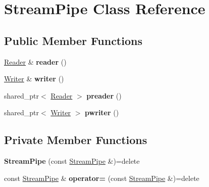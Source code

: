 \hypertarget{classStreamPipe}{\section{Stream\+Pipe Class Reference}
\label{classStreamPipe}
}
\subsection*{Public Member Functions}
\begin{DoxyCompactItemize}
\item 
\hypertarget{classStreamPipe_a3bda0cad2eeb4d45ba08e38bf4ff1e80}{\hyperlink{classReader}{Reader} \& {\bfseries reader} ()}\label{classStreamPipe_a3bda0cad2eeb4d45ba08e38bf4ff1e80}

\item 
\hypertarget{classStreamPipe_a88c87ff7040e79a8990da18a9cc24fbf}{\hyperlink{classWriter}{Writer} \& {\bfseries writer} ()}\label{classStreamPipe_a88c87ff7040e79a8990da18a9cc24fbf}

\item 
\hypertarget{classStreamPipe_a39bd201e4fc7dd256f1f8cab308102cc}{shared\+\_\+ptr$<$ \hyperlink{classReader}{Reader} $>$ {\bfseries preader} ()}\label{classStreamPipe_a39bd201e4fc7dd256f1f8cab308102cc}

\item 
\hypertarget{classStreamPipe_a9108aab013ce60f4815ddf4fcca25c19}{shared\+\_\+ptr$<$ \hyperlink{classWriter}{Writer} $>$ {\bfseries pwriter} ()}\label{classStreamPipe_a9108aab013ce60f4815ddf4fcca25c19}

\end{DoxyCompactItemize}
\subsection*{Private Member Functions}
\begin{DoxyCompactItemize}
\item 
\hypertarget{classStreamPipe_a57fdea36c848412cb3661940823c9031}{{\bfseries Stream\+Pipe} (const \hyperlink{classStreamPipe}{Stream\+Pipe} \&)=delete}\label{classStreamPipe_a57fdea36c848412cb3661940823c9031}

\item 
\hypertarget{classStreamPipe_af573e48a3e0c39a18ff35686618434ce}{const \hyperlink{classStreamPipe}{Stream\+Pipe} \& {\bfseries operator=} (const \hyperlink{classStreamPipe}{Stream\+Pipe} \&)=delete}\label{classStreamPipe_af573e48a3e0c39a18ff35686618434ce}

\end{DoxyCompactItemize}
